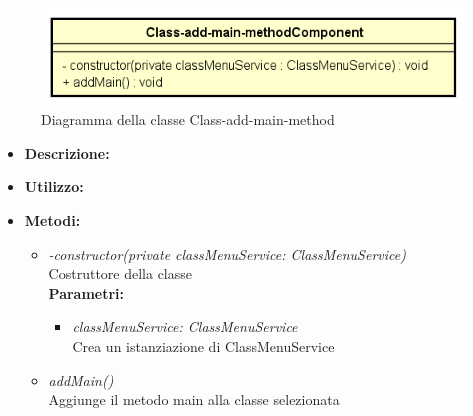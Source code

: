 \begin{figure}[h!]
	\centering
	\includegraphics[scale=0.8]{res/sections/SpecificaFrontEnd/Components/Disegnetti/class-add-main-method.png}
	\caption{Diagramma della classe Class-add-main-method}
\end{figure}

\begin{itemize}
	\item \textbf{Descrizione:}\\
	
	\item \textbf{Utilizzo:}\\
	
	\item \textbf{Metodi:}
		\begin{itemize}
			\item \emph{-constructor(private classMenuService: ClassMenuService)}\\
    		Costruttore della classe\\
    		\textbf{Parametri:}
    		\begin{itemize}
    			\item \emph{classMenuService: ClassMenuService}\\
    			Crea un istanziazione di ClassMenuService
    		\end{itemize}
    		\item \emph{addMain()}\\
    		Aggiunge il metodo main alla classe selezionata
		\end{itemize}
\end{itemize}